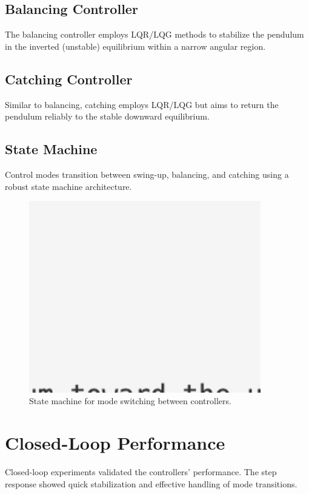 \documentclass[12pt]{article}
\begin{document}
\subsection{Balancing Controller}
The balancing controller employs LQR/LQG methods to stabilize the pendulum in the inverted (unstable) equilibrium within a narrow angular region.

\subsection{Catching Controller}
Similar to balancing, catching employs LQR/LQG but aims to return the pendulum reliably to the stable downward equilibrium.

\subsection{State Machine}
Control modes transition between swing-up, balancing, and catching using a robust state machine architecture.

\begin{figure}[H]
    \centering
    \includegraphics[width=0.9\textwidth]{figures/ph.png}
    \caption{State machine for mode switching between controllers.}
    \label{fig:state_machine}
\end{figure}

\section{Closed-Loop Performance}

Closed-loop experiments validated the controllers' performance. The step response showed quick stabilization and effective handling of mode transitions.
\end{document}
